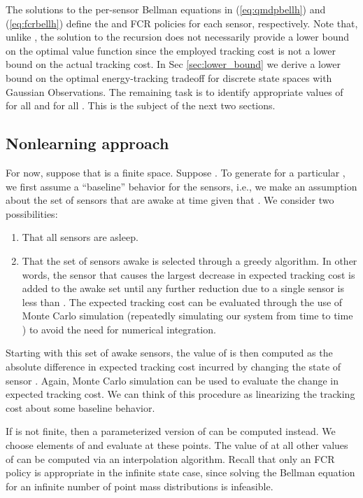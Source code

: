 \documentclass[journal,draftcls,onecolumn,11pt]{IEEEtran}
\newcommand{\QMDP}{}
\begin{document}
The solutions to the per-sensor Bellman equations in (\ref{eq:qmdpbellh}) and (\ref{eq:fcrbellh}) define the \QMDP{} and FCR policies for each sensor, respectively. Note that, unlike \cite{fuemmeler08,asilomar_scheduling,tsp_scheduling}, the solution to the \QMDP{} recursion does not necessarily provide a lower bound on the optimal value function since the employed tracking cost is not a lower bound on the actual tracking cost. In Sec \ref{sec:lower_bound} we derive a lower bound on the optimal energy-tracking tradeoff for discrete state spaces with Gaussian Observations. The remaining task is to identify appropriate values of  for all  and for all .  This is the subject of the next two sections.

\subsection{Nonlearning approach}
\label{sec:non_learning}
For now, suppose that  is a finite space.  Suppose .  To generate  for a particular , we first assume a ``baseline'' behavior for the sensors, i.e., we make an assumption about the set of sensors that are awake at time  given that .  We consider two possibilities:
\begin{enumerate}
   \item That all sensors are asleep.
   \item That the set of sensors awake is selected through a greedy algorithm.  In other words, the sensor that causes the largest decrease in expected tracking cost is added to the awake set until any further reduction due to a single sensor is less than .  The expected tracking cost can be evaluated through the use of Monte Carlo simulation (repeatedly simulating our system from time  to time ) to avoid the need for numerical integration.
\end{enumerate}
Starting with this set of awake sensors, the value of  is then computed as the absolute difference in expected tracking cost incurred by changing the state of sensor .  Again, Monte Carlo simulation can be used to evaluate the change in expected tracking cost.  We can think of this procedure as linearizing the tracking cost about some baseline behavior.

If  is not finite, then a parameterized version of  can be computed instead.  We choose  elements of  and evaluate  at these points.  The value of  at all other values of  can be computed via an interpolation algorithm.  Recall that only an FCR policy is appropriate in the infinite state case, since solving the \QMDP{} Bellman equation for an infinite number of point mass distributions is infeasible.
\end{document}
